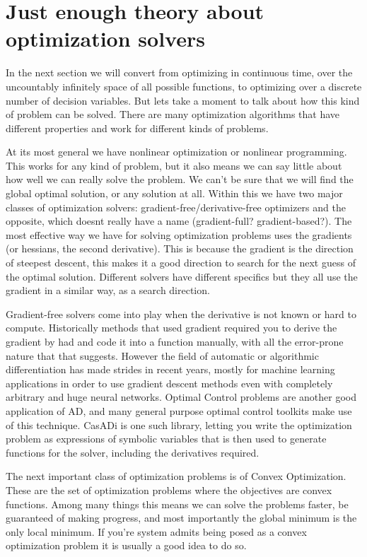 \documentclass[a4paper, 10pt, twocolumn]{article}
\begin{document}
\section{Just enough theory about optimization solvers}

In the next section we will convert from optimizing in continuous time, over the uncountably infinitely space of all possible functions, to optimizing over a discrete number of decision variables. But lets take a moment to talk about how this kind of problem can be solved. There are many optimization algorithms that have different properties and work for different kinds of problems.

At its most general we have nonlinear optimization or nonlinear programming. This works for any kind of problem, but it also means we can say little about how well we can really solve the problem. We can't be sure that we will find the global optimal solution, or any solution at all. Within this we have two major classes of optimization solvers: gradient-free/derivative-free optimizers and the opposite, which doesnt really have a name (gradient-full? gradient-based?). The most effective way we have for solving optimization problems uses the gradients (or hessians, the second derivative). This is because the gradient is the direction of steepest descent, this makes it a good direction to search for the next guess of the optimal solution. Different solvers have different specifics but they all use the gradient in a similar way, as a search direction.

Gradient-free solvers come into play when the derivative is not known or hard to compute. Historically methods that used gradient required you to derive the gradient by had and code it into a function manually, with all the error-prone nature that that suggests. However the field of automatic or algorithmic differentiation has made strides in recent years, mostly for machine learning applications in order to use gradient descent methods even with completely arbitrary and huge neural networks. Optimal Control problems are another good application of AD, and many general purpose optimal control toolkits make use of this technique. CasADi is one such library, letting you write the optimization problem as expressions of symbolic variables that is then used to generate functions for the solver, including the derivatives required.

The next important class of optimization problems is of Convex Optimization. These are the set of optimization problems where the objectives are convex functions. Among many things this means we can solve the problems faster, be guaranteed of making progress, and most importantly the global minimum is the only local minimum. If you're system admits being posed as a convex optimization problem it is usually a good idea to do so.
\end{document}
